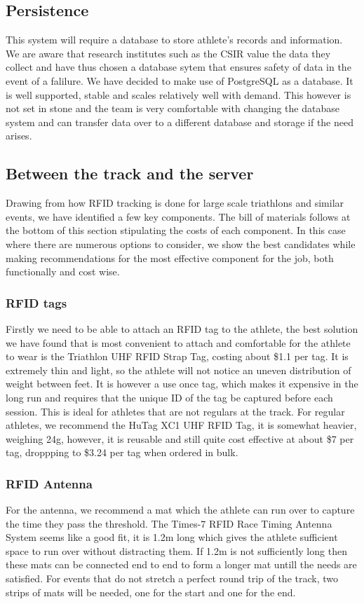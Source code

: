 \documentclass{article}
\begin{document}
\subsection{Persistence}
This system will require a database to store athlete's records and information. We are aware that research institutes such as the CSIR value the data they collect and have thus chosen a database sytem that ensures safety of data in the event of a falilure. We have decided to make use of PostgreSQL as a database. It is well supported, stable and scales relatively well with demand. This however is not set in stone and the team is very comfortable with changing the database system and can transfer data over to a different database and storage if the need arises.

\subsection{Between the track and the server}
Drawing from how RFID tracking is done for large scale triathlons and similar events, we have identified a few key components. The bill of materials follows at the bottom of this section stipulating the costs of each component. In this case where there are numerous options to consider, we show the best candidates while making recommendations for the most effective component for the job, both functionally and cost wise.

\subsubsection{RFID tags}
Firstly we need to be able to attach an RFID tag to the athlete, the best solution we have found that is most convenient to attach and comfortable for the athlete to wear is the Triathlon UHF RFID Strap Tag, costing about \$1.1 per tag. It is extremely thin and light, so the athlete will not notice an uneven distribution of weight between feet. It is however a use once tag, which makes it expensive in the long run and requires that the unique ID of the tag be captured before each session. This is ideal for athletes that are not regulars at the track. For regular athletes, we recommend the HuTag XC1 UHF RFID Tag, it is somewhat heavier, weighing 24g, however, it is reusable and still quite cost effective at about \$7 per tag, droppping to \$3.24 per tag when ordered in bulk.

\subsubsection{RFID Antenna}
For the antenna, we recommend a mat which the athlete can run over to capture the time they pass the threshold. The Times-7 RFID Race Timing Antenna System seems like a good fit, it is 1.2m long which gives the athlete sufficient space to run over without distracting them. If 1.2m is not sufficiently long then these mats can be connected end to end to form a longer mat untill the needs are satisfied. For events that do not stretch a perfect round trip of the track, two strips of mats will be needed, one for the start and one for the end.
\end{document}
